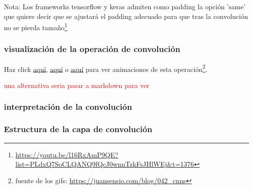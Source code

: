 \documentclass{article}
\begin{document}
Nota: Los frameworks tensorflow y keras admiten como padding la opción 'same' que quiere decir que se ajustará el padding adecuado para que tras la convolución no se pierda tamaño\footnote{\url{https://youtu.be/l16RxAmP9QE?list=PLdxQ7SoCLQANQ9fQcJ0wnnTzkFsJHlWEj&t=1376}}

\subsubsection{visualización de la operación de convolución}

Haz click \href{https://miro.medium.com/max/1052/1*GcI7G-JLAQiEoCON7xFbhg.gif}{aquí}, \href{https://cdn-media-1.freecodecamp.org/images/gb08-2i83P5wPzs3SL-vosNb6Iur5kb5ZH43}{aquí} o \href{https://thumbs.gfycat.com/AffectionateMemorableGreyhounddog-size_restricted.gif}{aquí} para ver animaciones de esta operación\footnote{fuente de los gifs: \url{https://juansensio.com/blog/042_cnns}}.

\textcolor{red}{una alternativa seria pasar a markdown para ver }\\





\subsubsection{interpretación de la convolución}


\subsubsection{Estructura de la capa de convolución}
\end{document}
